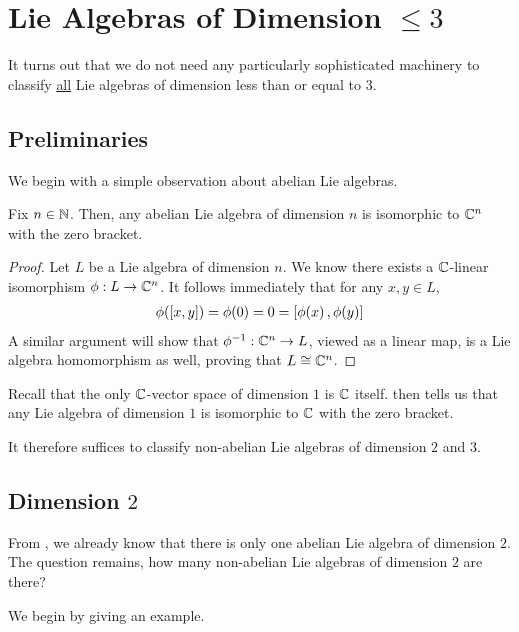 \section{Lie Algebras of Dimension $\leq 3$}

It turns out that we do not need any particularly sophisticated machinery to classify \underline{all} Lie algebras of dimension less than or equal to $3$.

\subsection{Preliminaries}

We begin with a simple observation about abelian Lie algebras.

\begin{proposition}\label{Ch1:Prop:Abelian_Lie_Algebras_Iso}
    Fix $n \in \mathbb{N}$. Then, any abelian Lie algebra of dimension $n$ is isomorphic to $\mathbb{C}^n$ with the zero bracket.
\end{proposition}
\begin{proof}
    Let $L$ be a Lie algebra of dimension $n$. We know there exists a $\mathbb{C}$-linear isomorphism $\phi : L \to \mathbb{C}^n$. It follows immediately that for any $x, y \in L$,
    \begin{align*}
        \phi\!\left( \left[ x, y \right] \right) = \phi\!\left( 0 \right) = 0 = \left[ \phi\!\left( x \right), \phi\!\left( y \right) \right]
    \end{align*}
    A similar argument will show that $\phi^{-1} : \mathbb{C}^n \to L$, viewed as a linear map, is a Lie algebra homomorphism as well, proving that $L \cong \mathbb{C}^n$.
\end{proof}

Recall that the only $\mathbb{C}$-vector space of dimension $1$ is $\mathbb{C}$ itself.  then tells us that any Lie algebra of dimension $1$ is isomorphic to $\mathbb{C}$ with the zero bracket.

It therefore suffices to classify non-abelian Lie algebras of dimension $2$ and $3$.

\subsection{Dimension $2$}

From , we already know that there is only one abelian Lie algebra of dimension $2$. The question remains, how many non-abelian Lie algebras of dimension $2$ are there?

We begin by giving an example.

